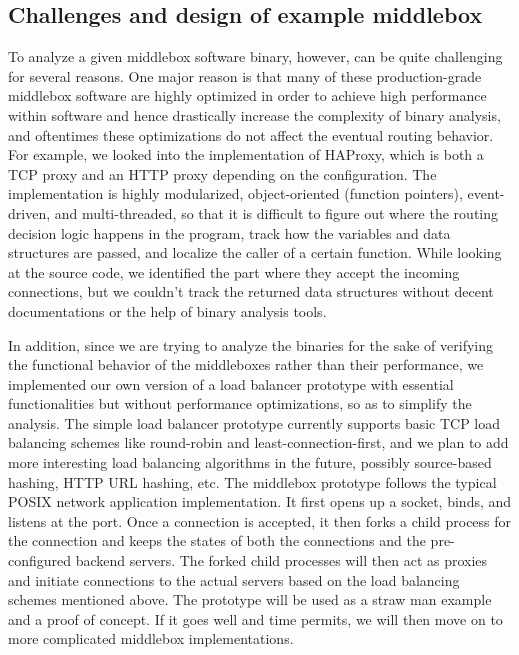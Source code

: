

\subsection{Challenges and design of example middlebox}

To analyze a given middlebox software binary, however, can be quite challenging
for several reasons. One major reason is that many of these production-grade
middlebox software are highly optimized in order to achieve high performance
within software and hence drastically increase the complexity of binary
analysis, and oftentimes these optimizations do not affect the eventual routing
behavior. For example, we looked into the implementation of HAProxy, which is
both a TCP proxy and an HTTP proxy depending on the configuration. The
implementation is highly modularized, object-oriented (function pointers),
event-driven, and multi-threaded, so that it is difficult to figure out where
the routing decision logic happens in the program, track how the variables and
data structures are passed, and localize the caller of a certain function. While
looking at the source code, we identified the part where they accept the
incoming connections, but we couldn't track the returned data structures without
decent documentations or the help of binary analysis tools.

In addition, since we are trying to analyze the binaries for the sake of
verifying the functional behavior of the middleboxes rather than their
performance, we implemented our own version of a load balancer prototype with
essential functionalities but without performance optimizations, so as to
simplify the analysis. The simple load balancer prototype currently supports
basic TCP load balancing schemes like round-robin and least-connection-first,
and we plan to add more interesting load balancing algorithms in the future,
possibly source-based hashing, HTTP URL hashing, etc. The middlebox prototype
follows the typical POSIX network application implementation. It first opens up
a socket, binds, and listens at the port. Once a connection is accepted, it then
forks a child process for the connection and keeps the states of both the
connections and the pre-configured backend servers. The forked child processes
will then act as proxies and initiate connections to the actual servers based on
the load balancing schemes mentioned above. The prototype will be used as a
straw man example and a proof of concept. If it goes well and time permits, we
will then move on to more complicated middlebox implementations.

